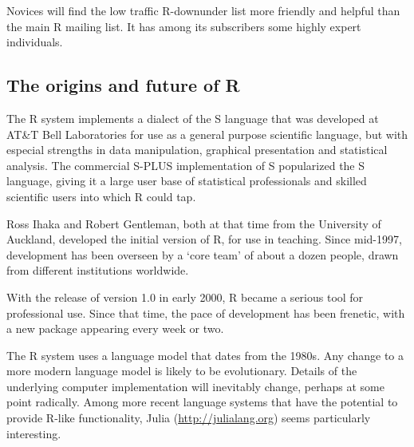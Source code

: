 Novices will find the low traffic R-downunder list more friendly and
helpful than the main R mailing list. It has among its subscribers
some highly expert individuals.

\subsection*{The origins and future of R}

The R system implements a dialect of the S language 
that was developed at AT\&T Bell Laboratories for use as
a general purpose scientific language, but with especial strengths in
data manipulation, graphical presentation and statistical
analysis. The commercial S-PLUS implementation of S popularized the S
language, giving it a large user base of statistical professionals and
skilled scientific users into which R could tap.

Ross Ihaka and Robert Gentleman, both at that time from the University
of Auckland, developed the initial version of R, for use in teaching.
Since mid-1997, development has been overseen by a `core team'
of about a dozen people, drawn from different institutions worldwide.

With the release of version 1.0 in early 2000, R became a serious tool
for professional use.  Since that time, the pace of development has
been frenetic, with a new package appearing every week or two.

The R system uses a language model that dates from the
1980s.  Any change to a more modern language model is likely to be
evolutionary.  Details of the underlying computer implementation will
inevitably change, perhaps at some point radically. Among
more recent language systems   that have the potential to provide R-like functionality,
Julia (\url{http://julialang.org}) seems particularly interesting.

